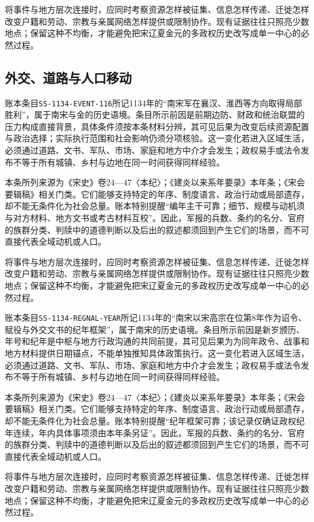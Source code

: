 将事件与地方层次连接时，应同时考察资源怎样被征集、信息怎样传递、迁徙怎样改变户籍和劳动、宗教与亲属网络怎样提供或限制协作。现有证据往往只照亮少数地点；保留这种不均衡，才能避免把宋辽夏金元的多政权历史改写成单一中心的必然过程。

\subsection{外交、道路与人口移动}

账本条目\texttt{SS-1134-EVENT-116}所记1134年的“南宋军在襄汉、淮西等方向取得局部胜利”，属于南宋与金的历史语境。条目所示前因是前期边防、财政和统治联盟的压力构成直接背景，具体条件须按本条材料分辨，其可见后果为改变后续资源配置与政治选择；实际执行范围和社会影响仍须分项核验。这一变化若进入区域生活，必须通过道路、文书、军队、市场、家庭和地方中介才会发生；政权易手或法令发布不等于所有城镇、乡村与边地在同一时间获得同样经验。

本条所列来源为《宋史》卷24—47〈本纪〉；《建炎以来系年要录》本年条；《宋会要辑稿》相关门类。它们能够支持特定的年序、制度语言、政治行动或局部遗存，却不能无条件化为社会总量。账本特别提醒“编年主干可靠；细节、规模与动机须与对方材料、地方文书或考古材料互校”。因此，军报的兵数、条约的名分、官府的族群分类、判牍中的道德判断以及后出的叙述都须回到产生它们的场景，而不可直接代表全域动机或人口。

将事件与地方层次连接时，应同时考察资源怎样被征集、信息怎样传递、迁徙怎样改变户籍和劳动、宗教与亲属网络怎样提供或限制协作。现有证据往往只照亮少数地点；保留这种不均衡，才能避免把宋辽夏金元的多政权历史改写成单一中心的必然过程。

账本条目\texttt{SS-1134-REGNAL-YEAR}所记1134年的“南宋以宋高宗在位第8年作为诏令、赋役与外交文书的纪年框架”，属于南宋的历史语境。条目所示前因是新岁颁历、年号和纪年是中枢与地方行政沟通的共同前提，其可见后果为为同年政令、战事和地方材料提供日期锚点，不能单独推知具体政策执行。这一变化若进入区域生活，必须通过道路、文书、军队、市场、家庭和地方中介才会发生；政权易手或法令发布不等于所有城镇、乡村与边地在同一时间获得同样经验。

本条所列来源为《宋史》卷24—47〈本纪〉；《建炎以来系年要录》本年条；《宋会要辑稿》相关门类。它们能够支持特定的年序、制度语言、政治行动或局部遗存，却不能无条件化为社会总量。账本特别提醒“纪年框架可靠；该记录仅确证政权纪年连续，年内具体事项须由本年条另证”。因此，军报的兵数、条约的名分、官府的族群分类、判牍中的道德判断以及后出的叙述都须回到产生它们的场景，而不可直接代表全域动机或人口。

将事件与地方层次连接时，应同时考察资源怎样被征集、信息怎样传递、迁徙怎样改变户籍和劳动、宗教与亲属网络怎样提供或限制协作。现有证据往往只照亮少数地点；保留这种不均衡，才能避免把宋辽夏金元的多政权历史改写成单一中心的必然过程。

